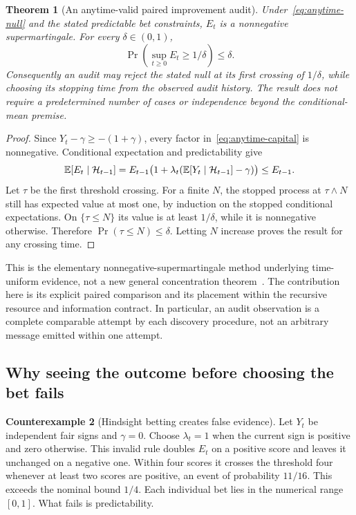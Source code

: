 \documentclass[11pt,letterpaper]{article}
\theoremstyle{plain}
\newtheorem{theorem}{Theorem}[section]
\theoremstyle{definition}
\newtheorem{counterexample}[theorem]{Counterexample}
\begin{document}
\begin{theorem}[An anytime-valid paired improvement audit]\label{thm:anytime}
Under~\eqref{eq:anytime-null} and the stated predictable bet constraints, $E_t$ is a nonnegative supermartingale. For every $\delta\in(0,1)$,
\[
\Pr\left(\sup_{t\geq0}E_t\geq1/\delta\right)\leq\delta.
\]
Consequently an audit may reject the stated null at its first crossing of $1/\delta$, while choosing its stopping time from the observed audit history. The result does not require a predetermined number of cases or independence beyond the conditional-mean premise.
\end{theorem}
\begin{proof}
Since $Y_t-\gamma\geq-(1+\gamma)$, every factor in~\eqref{eq:anytime-capital} is nonnegative. Conditional expectation and predictability give
\[
\mathbb E[E_t\mid\mathcal H_{t-1}]
=E_{t-1}\bigl(1+\lambda_t(\mathbb E[Y_t\mid\mathcal H_{t-1}]-\gamma)\bigr)
\leq E_{t-1}.
\]
Let $\tau$ be the first threshold crossing. For a finite $N$, the stopped process at $\tau\wedge N$ still has expected value at most one, by induction on the stopped conditional expectations. On $\{\tau\leq N\}$ its value is at least $1/\delta$, while it is nonnegative otherwise. Therefore $\Pr(\tau\leq N)\leq\delta$. Letting $N$ increase proves the result for any crossing time.
\end{proof}

This is the elementary nonnegative-supermartingale method underlying time-uniform evidence, not a new general concentration theorem~\cite{howard}. The contribution here is its explicit paired comparison and its placement within the recursive resource and information contract. In particular, an audit observation is a complete comparable attempt by each discovery procedure, not an arbitrary message emitted within one attempt.

\subsection{Why seeing the outcome before choosing the bet fails}
\begin{counterexample}[Hindsight betting creates false evidence]\label{ex:hindsight-bet}
Let $Y_t$ be independent fair signs and $\gamma=0$. Choose $\lambda_t=1$ when the current sign is positive and zero otherwise. This invalid rule doubles $E_t$ on a positive score and leaves it unchanged on a negative one. Within four scores it crosses the threshold four whenever at least two scores are positive, an event of probability $11/16$. This exceeds the nominal bound $1/4$. Each individual bet lies in the numerical range $[0,1]$. What fails is predictability.
\end{counterexample}
\end{document}

